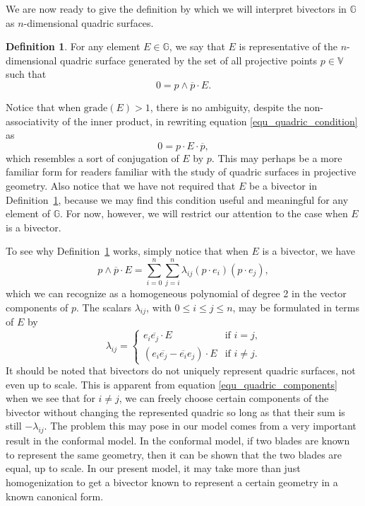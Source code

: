 \documentclass{ecgd-l}
\newcommand{\G}{\mathbb{G}}
\newcommand{\V}{\mathbb{V}}
\theoremstyle{definition}
\newtheorem{definition}[theorem]{Definition}
\theoremstyle{remark}
\numberwithin{equation}{section}
\begin{document}
We are now ready to give the definition by which we will interpret bivectors in $\G$
as $n$-dimensional quadric surfaces.
\begin{definition}\label{def_quadric}
For any element $E\in\G$, we say that $E$ is representative of the $n$-dimensional
quadric surface generated by the set of all projective points $p\in\V$ such that
\begin{equation}\label{equ_quadric_condition}
0 = p\wedge\overline{p}\cdot E.
\end{equation}
\end{definition}
Notice that when $\mbox{grade}(E)>1$, there is no ambiguity, despite the non-associativity
of the inner product, in rewriting equation
\eqref{equ_quadric_condition} as
\begin{equation}
0 = p\cdot E\cdot\overline{p},
\end{equation}
which resembles a sort of conjugation of $E$ by $p$.  This may perhaps be a more
familiar form for readers familiar with the study of quadric surfaces in projective geometry.
Also notice that we have not required that $E$ be a bivector in Definition~\ref{def_quadric},
because we may find this condition useful and meaningful for any element of $\G$.  For now,
however, we will restrict our attention to the case when $E$ is a bivector.

To see why Definition~\ref{def_quadric} works, simply notice that when $E$ is a bivector, we have
\begin{equation}\label{equ_homogeneous_polynomial}
p\wedge\overline{p}\cdot E=\sum_{i=0}^n\sum_{j=i}^n \lambda_{ij}(p\cdot e_i)(p\cdot e_j),
\end{equation}
which we can recognize as a homogeneous polynomial of degree 2 in the vector components of $p$.
The scalars $\lambda_{ij}$, with $0\leq i\leq j\leq n$, may be formulated in terms of $E$ by
\begin{equation}\label{equ_quadric_components}
\lambda_{ij} = \left\{\begin{array}{ll}
e_i\overline{e_j}\cdot E & \mbox{if $i=j$,} \\
\left(e_i\overline{e_j}-\overline{e_i}e_j\right)\cdot E & \mbox{if $i\neq j$.}
\end{array}\right.
\end{equation}
It should be noted that bivectors do not uniquely represent quadric surfaces, not even up to scale.
This is apparent from equation \eqref{equ_quadric_components} when we see that for $i\neq j$,
we can freely choose certain components of the bivector without changing the represented
quadric so long as that their sum is still $-\lambda_{ij}$.  The problem this may pose in our model
comes from a very important result in the conformal model.  In the conformal model, if
two blades are known to represent the same geometry, then it can be shown that the
two blades are equal, up to scale.  In our present model, it may take more than just
homogenization to get a bivector known to represent a certain geometry in a
known canonical form.
\end{document}
